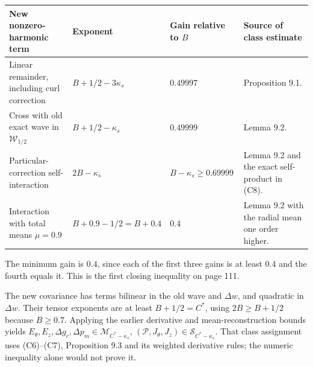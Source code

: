 \documentclass[10pt,a4paper]{article}
\newcounter{none}
\begin{document}
{\def\LTcaptype{none} %
\begin{longtable}[]{@{}
  >{\raggedright\arraybackslash}p{}
  >{\raggedright\arraybackslash}p{}
  >{\raggedright\arraybackslash}p{}
  >{\raggedright\arraybackslash}p{}@{}}
\toprule\noalign{}
\begin{minipage}[b]{\linewidth}\raggedright
New nonzero-harmonic term
\end{minipage} & \begin{minipage}[b]{\linewidth}\raggedright
Exponent
\end{minipage} & \begin{minipage}[b]{\linewidth}\raggedright
Gain relative to \(B\)
\end{minipage} & \begin{minipage}[b]{\linewidth}\raggedright
Source of class estimate
\end{minipage} \\
\midrule\noalign{}
\endhead
\bottomrule\noalign{}
\endlastfoot
Linear remainder, including curl correction & \(B+1/2-3\kappa_s\) & \(0.49997\) & Proposition 9.1. \\
Cross with old exact wave in \(\mathcal W_{1/2}\) & \(B+1/2-\kappa_s\) & \(0.49999\) & Lemma 9.2. \\
Particular-correction self-interaction & \(2B-\kappa_s\) & \(B-\kappa_s\ge0.69999\) & Lemma 9.2 and the exact self-product in (C8). \\
Interaction with total means \(\mu=0.9\) & \(B+0.9-1/2=B+0.4\) & \(0.4\) & Lemma 9.2 with the radial mean one order higher. \\
\end{longtable}
}

The minimum gain is \(0.4\), since each of the first three gains is at least \(0.4\) and the fourth equals it. This is the first closing inequality on page 111.

The new covariance has terms bilinear in the old wave and \(\Delta w\), and quadratic in \(\Delta w\). Their tensor exponents are at least \(B+1/2=C^*\), using \(2B\ge B+1/2\) because \(B\ge0.7\). Applying the earlier derivative and mean-reconstruction bounds yields \(E_\theta,E_z,\Delta g_r,\Delta p_m\in\mathcal M_{C^*-\kappa_s}\), \((\mathcal P,J_\theta,J_z)\in\mathcal S_{C^*-\kappa_s}\). That class assignment uses (C6)--(C7), Proposition 9.3 and its weighted derivative rules; the numeric inequality alone would not prove it.
\end{document}
